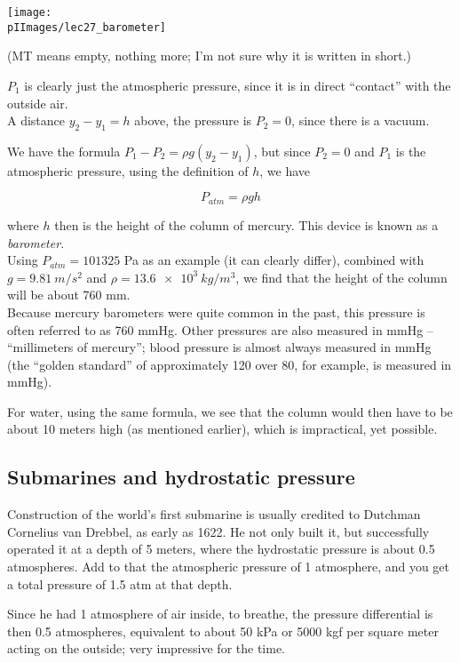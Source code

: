 \begin{center}
\texttt{[image: \\pIImages/lec27\_barometer]}
\end{center}

(MT means empty, nothing more; I'm not sure why it is written in short.)

$P_1$ is clearly just the atmospheric pressure, since it is in direct ``contact'' with the outside air.\\
A distance $y_2 - y_1 = h$ above, the pressure is $P_2 = 0$, since there is a vacuum.

We have the formula $P_1 - P_2 = \rho g(y_2 - y_1)$, but since $P_2 = 0$ and $P_1$ is the atmospheric pressure, using the definition of $h$, we have

\begin{equation}
P_{atm} = \rho g h
\end{equation}

where $h$ then is the height of the column of mercury. This device is known as a \emph{barometer}.\\
Using $P_{atm} = 101325$ Pa as an example (it can clearly differ), combined with $g = \SI{9.81}{m/s^2}$ and $\rho = \SI{13.6e3}{kg/m^3}$, we find that the height of the column will be about 760 mm.\\
Because mercury barometers were quite common in the past, this pressure is often referred to as 760 mmHg. Other pressures are also measured in mmHg -- ``millimeters of mercury''; blood pressure is almost always measured in mmHg (the ``golden standard'' of approximately 120 over 80, for example, is measured in mmHg).

For water, using the same formula, we see that the column would then have to be about 10 meters high (as mentioned earlier), which is impractical, yet possible.

\subsection{Submarines and hydrostatic pressure}

Construction of the world's first submarine is usually credited to Dutchman Cornelius van Drebbel, as early as 1622. He not only built it, but successfully operated it at a depth of 5 meters, where the hydrostatic pressure is about 0.5 atmospheres. Add to that the atmospheric pressure of 1 atmosphere, and you get a total pressure of 1.5 atm at that depth.

Since he had 1 atmosphere of air inside, to breathe, the pressure differential is then 0.5 atmospheres, equivalent to about 50 kPa or 5000 kgf per square meter acting on the outside; very impressive for the time.

